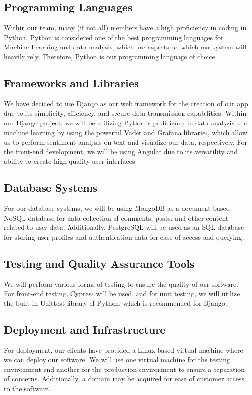 \documentclass[12pt]{article}
\begin{document}
\subsection{Programming Languages}
Within our team, many (if not all) members have a high proficiency in coding in Python. Python is considered one of the best programming languages for Machine Learning and data analysis, which are aspects on which our system will heavily rely. Therefore, Python is our programming language of choice.

\subsection{Frameworks and Libraries}
We have decided to use Django as our web framework for the creation of our app due to its simplicity, efficiency, and secure data transmission capabilities. Within our Django project, we will be utilizing Python's proficiency in data analysis and machine learning by using the powerful Vader and Grafana libraries, which allow us to perform sentiment analysis on text and visualize our data, respectively. For the front-end development, we will be using Angular due to its versatility and ability to create high-quality user interfaces.

\subsection{Database Systems}
For our database systems, we will be using MongoDB as a document-based NoSQL database for data collection of comments, posts, and other content related to user data. Additionally, PostgreSQL will be used as an SQL database for storing user profiles and authentication data for ease of access and querying.

\subsection{Testing and Quality Assurance Tools}
We will perform various forms of testing to ensure the quality of our software. For front-end testing, Cypress will be used, and for unit testing, we will utilize the built-in Unittest library of Python, which is recommended for Django.

\subsection{Deployment and Infrastructure}
For deployment, our clients have provided a Linux-based virtual machine where we can deploy our software. We will use one virtual machine for the testing environment and another for the production environment to ensure a separation of concerns. Additionally, a domain may be acquired for ease of customer access to the software.
\end{document}

